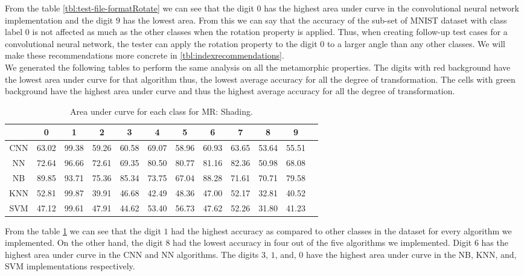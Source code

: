      From the table \ref{tbl:test-file-formatRotate} we can see that the digit $0$ has the highest area under curve in the convolutional neural network implementation and the digit $9$ has the lowest area. From this we can say that the accuracy of the sub-set of MNIST dataset with class label $0$ is not affected as much as the other classes when the rotation property is applied. Thus, when creating follow-up test cases for a convolutional neural network, the tester can apply the rotation property to the digit $0$ to a larger angle than any other classes. We will make these recommendations more concrete in \ref{tbl:indexrecommendations}.\\
     We generated the following tables to perform the same analysis on all the metamorphic properties. The digits with red background have the lowest area under curve for that algorithm thus, the lowest average accuracy for all the degree of transformation. The cells with green background have the highest area under curve and thus the highest average accuracy for all the degree of transformation. 
    
    \begin{table}[H]
    \centering
    \begin{tabular}{|c|c|c|c|c|c|c|c|c|c|c|c|}
    \hline
     & 0 & 1 & 2 & 3 & 4 & 5 & 6 & 7 & 8 & 9 \\
    \hline
    CNN & 63.02 & \cellcolor{green!25}99.38 & 59.26 & 60.58 & 69.07 & 58.96 & 60.93 & 63.65 & \cellcolor{red!25}53.64 & 55.51 \\ 
    \hline
    NN & 72.64 & \cellcolor{green!25}96.66 & 72.61 & 69.35 & 80.50 & 80.77 & 81.16 & 82.36 & \cellcolor{red!25}50.98 & 68.08 \\
    \hline
    NB & 89.85 & \cellcolor{green!25}93.71 & 75.36 & 85.34 & 73.75 & \cellcolor{red!25}67.04 & 88.28 & 71.61 & 70.71 & 79.58 \\
    \hline
    KNN & 52.81 & \cellcolor{green!25}99.87 & 39.91 & 46.68 & 42.49 & 48.36 & 47.00 & 52.17 & \cellcolor{red!25}32.81 & 40.52 \\
    \hline
    SVM & 47.12 & \cellcolor{green!25}99.61 & 47.91 & 44.62 & 53.40 & 56.73 & 47.62 & 52.26 & \cellcolor{red!25}31.80 & 41.23 \\
    \hline
    \end{tabular}
    \caption{Area under curve for each class for MR: Shading.}
    \label{tbl:test-file-formatShade}
    \end{table}
    From the table \ref{tbl:test-file-formatShade} we can see that the digit $1$ had the highest accuracy as compared to other classes in the dataset for every algorithm we implemented. On the other hand, the digit $8$ had the lowest accuracy in four out of the five algorithms we implemented.
    Digit $6$ has the highest area under curve in the CNN and NN algorithms. The digits $3$, $1$, and, $0$ have the highest area under curve in the NB, KNN, and, SVM implementations respectively.
    
